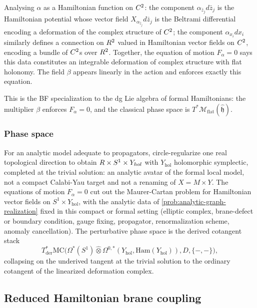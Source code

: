 \documentclass[11pt]{memoir}
\begin{document}
Analysing $\alpha$ as a Hamiltonian function on $C^2$: the component
$\alpha_{\bar z_j}d\bar z_j$ is the Hamiltonian potential whose vector field
$X_{\alpha_{\bar z_j}}d\bar z_j$ is the Beltrami differential encoding a
deformation of the complex structure of $C^2$; the component
$\alpha_{x_i}dx_i$ similarly defines a connection on $R^2$ valued in
Hamiltonian vector fields on $C^2$, encoding a bundle of $C^2$s over
$R^2$. Together, the
equation of motion $F_\alpha=0$ says this data constitutes an integrable
deformation of complex structure with flat holonomy. The field $\beta$ appears
linearly in the action and enforces exactly this equation.

\begin{rmk}
  This is the BF specialization to the dg Lie algebra of formal Hamiltonians:
  the multiplier $\beta$ enforces $F_\alpha=0$, and the classical phase space
  is $T^*\mathcal M_{\mathrm{flat}}(\widehat{\mathfrak h})$.
\end{rmk}

\subsubsection{Phase space}

For an analytic model adequate to propagators, circle-regularize one real
topological direction to obtain $R\times S^1\times Y_{hol}$ with
$Y_{\mathrm{hol}}$ holomorphic symplectic, completed at the trivial
solution: an analytic avatar of the formal local model, not a compact
Calabi-Yau target and not a renaming of $X=M\times Y$. The
equations of motion $F_\alpha=0$ cut out the Maurer-Cartan problem for
Hamiltonian vector fields on $S^1\times Y_{\mathrm{hol}}$, with the analytic
data of \ref{prob:analytic-graph-realization} fixed in this compact or
formal setting (elliptic complex, brane-defect or boundary condition, gauge
fixing, propagator, renormalization scheme, anomaly cancellation). The
perturbative phase space is the derived cotangent stack
$$T^*_{\mathrm{der}}\mathrm{MC}\bigl(\Omega^*(S^1)\widehat\otimes
  \Omega^{0,*}(Y_{\mathrm{hol}},\mathrm{Ham}(Y_{\mathrm{hol}})),D,\{-,-\}\bigr),$$
collapsing on the underived tangent at the trivial solution to the ordinary
cotangent of the linearized deformation complex.

\subsection{Reduced Hamiltonian brane coupling}
\end{document}
